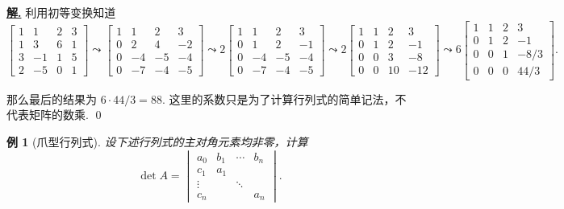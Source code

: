 \documentclass[10pt,openany]{article}
\theoremstyle{thmstyle} %
\theoremstyle{defstyle} %
\theoremstyle{prostyle} %
\theoremstyle{exastyle}
\newtheorem{example}[theorem]{例}
\theoremstyle{remstyle}
\newenvironment{solution}{\par\underline{\textbf{解.}} \;\fangsong}{\qed\par}
\begin{document}
\begin{solution}
	利用初等变换知道
	\[ \begin{bmatrix}
		1 & 1 & 2 & 3 \\
		1 & 3 & 6 & 1 \\
		3 & -1 & 1 & 5 \\
		2 & -5 & 0 & 1
	\end{bmatrix} \leadsto \begin{bmatrix}
	1 & 1 & 2 & 3 \\
	0 & 2 & 4 & -2 \\
	0 & -4 & -5 & -4 \\
	0 & -7 & -4 & -5
	\end{bmatrix} \leadsto 2 \begin{bmatrix}
	1 & 1 & 2 & 3 \\
	0 & 1 & 2 & -1 \\
	0 & -4 & -5 & -4 \\
	0 & -7 & -4 & -5
\end{bmatrix} \leadsto 2 \begin{bmatrix}
1 & 1 & 2 & 3 \\
0 & 1 & 2 & -1 \\
0 & 0 & 3 & -8 \\
0 & 0 & 10 & -12
\end{bmatrix} \leadsto 6 \begin{bmatrix}
1 & 1 & 2 & 3 \\
0 & 1 & 2 & -1 \\
0 & 0 & 1 & -8/3 \\
0 & 0 & 0 & 44/3
\end{bmatrix}.   \]

那么最后的结果为 \( 6 \cdot 44/3=88 \). 这里的系数只是为了计算行列式的简单记法，不代表矩阵的数乘.
\end{solution}

\begin{example}[爪型行列式]	\label{2.2.18}
	设下述行列式的主对角元素均非零，计算
	\[ \det A= \begin{vmatrix}
		a_0 & b_1 & \cdots & b_n \\
		c_1 & a_1 &  & \\
		\vdots &  & \ddots & \\
		c_n &       &        & a_n
	\end{vmatrix}. \]

\end{example}
\end{document}
